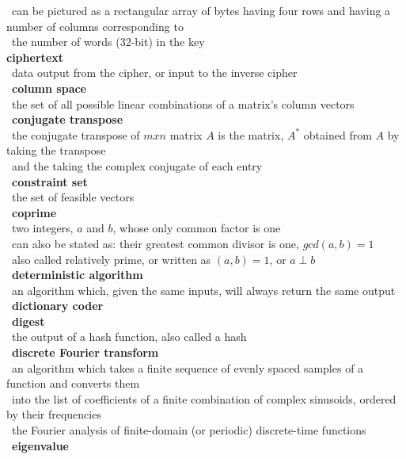 \documentclass[10pt,letterpaper]{scrartcl}
\newcommand{\tbul}{\textbullet}
\newcommand{\tend}{\>\textendash}
\newcommand{\tasc}{\>\>\textasteriskcentered}
\begin{document}
\begin{tabbing}
\begin{tabbing}
    \tasc\ can be pictured as a rectangular array of bytes having four rows and having a number of columns corresponding to\\ \>\ the number of words (32-bit) in the key \\
\tbul \textbf{ciphertext} \\
    \tend\ data output from the cipher, or input to the inverse cipher \\
\tbul\ \textbf{column space} \\
    \tend\ the set of all possible linear combinations of a matrix's column vectors \\
\tbul\ \textbf{conjugate transpose} \\
    \tend\ the conjugate transpose of $mxn$ matrix $A$ is the matrix, $A^*$ obtained from $A$ by taking the transpose \\ \>\ and the taking the complex conjugate of each entry \\
\tbul\ \textbf{constraint set} \\
    \tend\ the set of feasible vectors \\
\tbul\ \textbf{coprime} \\
    \tend\ two integers, $a$ and $b$, whose only common factor is one \\
    \tend\ can also be stated as: their greatest common divisor is one, $gcd(a,b)=1$ \\
    \tend\ also called relatively prime, or written as $(a,b)=1$, or $a\perp b$ \\
\tbul\ \textbf{deterministic algorithm} \\
    \tend\ an algorithm which, given the same inputs, will always return the same output\\
\tbul\ \textbf{dictionary coder} \\
\tbul\ \textbf{digest} \\
    \tend\ the output of a hash function, also called a hash \\
\tbul\ \textbf{discrete Fourier transform} \\
    \tend\ an algorithm which takes a finite sequence of evenly spaced samples of a function and converts them \\ \>\ into the list of coefficients of a finite combination of complex sinusoids, ordered by their frequencies \\
    \tend\ the Fourier analysis of finite-domain (or periodic) discrete-time functions \\
\tbul\ \textbf{eigenvalue} \\

\end{tabbing}
\end{tabbing}
\end{document}
